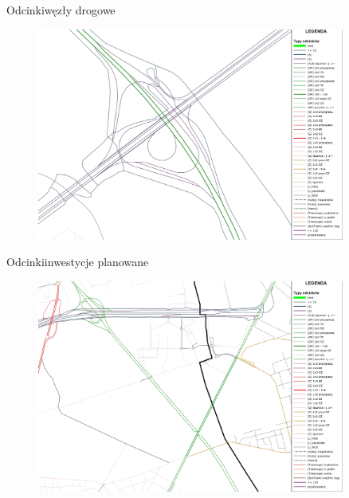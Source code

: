 \documentclass[8pt]{beamer}
\begin{document}
\begin{frame}{Odcinki}{węzły drogowe}
\begin{figure}
\begin{center}
\includegraphics[width=0.9\textwidth]{junction}
 \end{center}
  \end{figure} 
\end{frame}


\begin{frame}{Odcinki}{inwestycje planowane}
\begin{figure}
\begin{center}
\includegraphics[width=0.9\textwidth]{planned}
 \end{center}
  \end{figure} 
\end{frame}
\end{document}
